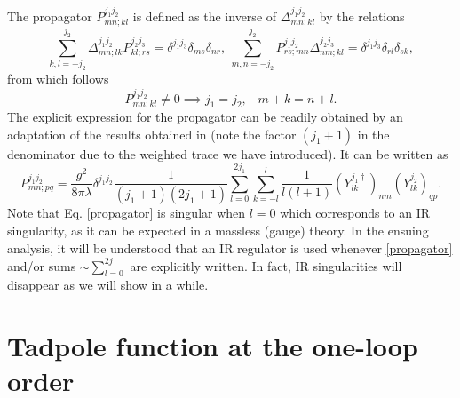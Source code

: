 \documentclass[a4paper,11pt]{article}
\numberwithin{equation}{section}
\theoremstyle{nonumberplain}
\begin{document}
The propagator $P^{j_1 j_2}_{mn;kl}$ is defined as the inverse of $\Delta^{j_1 j_2}_{mn;kl}$ by the relations
\begin{equation}
\sum_{k,l=-j_2}^{j_2}\Delta^{j_1 j_2}_{mn;lk}P^{j_2 j_3}_{kl;rs}=\delta^{j_1 j_3}\delta_{ms}\delta_{nr},\ \sum_{m,n=-j_2}^{j_2}P^{j_1 j_2}_{rs;mn}\Delta^{j_2 j_3}_{nm;kl}=\delta^{j_1 j_3}\delta_{rl}\delta_{sk}\label{definvers},
\end{equation}
from  which follows
\begin{equation}
P^{j_1 j_2}_{mn;kl}\ne0\implies     j_1=j_2,\;\;\;m+k= n+l\label{consindice2}.
\end{equation}
The explicit expression for the propagator can be readily obtained by an  adaptation of the results obtained in \cite{vit-wal-12} (note the factor $(j_1+1)$ in the denominator due to the weighted trace we have introduced). It can be written as
\begin{equation}
P^{j_1 j_2}_{mn;pq}= \frac{g^2}{8\pi\lambda}\delta^{j_1 j_2}\frac{1}{(j_1+1)(2j_1+1)}\sum_{l=0}^{2j_1} \sum_{k=-l}^l\frac{1}{l(l+1)} (Y^{j_1\dag}  _{l k})_{nm} (Y^{j_2}_{l k})_{qp}\label{propagator}.
\end{equation}
Note that Eq.  \eqref{propagator} is singular when $l=0$ which corresponds to an IR singularity, as it can be expected in a massless (gauge) theory. In the ensuing analysis, it will be understood that an IR regulator is used whenever \eqref{propagator} and/or sums $\sim\sum_{l=0}^{2j}$ are explicitly written. In fact, IR singularities will disappear as we will show in a while.\par


\section{Tadpole function at the one-loop order}\label{section4}
\end{document}
